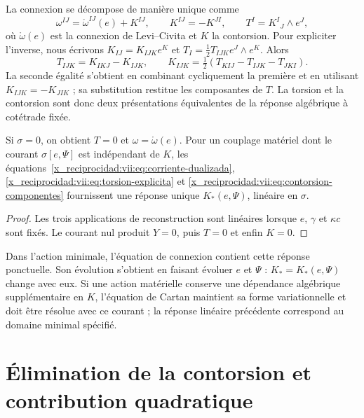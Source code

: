\begin{HMTCompactSection}
La connexion se décompose de manière unique comme
\begin{equation}
 \omega^{IJ}=\mathring\omega^{IJ}(e)+K^{IJ},\qquad
 K^{IJ}=-K^{JI},\qquad T^I=K^I{}_{J}\wedge e^J,
 \label{x_reciprocidad:vii:eq:contorsion}
\end{equation}
où \(\mathring\omega(e)\) est la connexion de Levi--Civita et \(K\) la contorsion. Pour expliciter l'inverse, nous écrivons \(K_{IJ}=K_{IJK}e^K\) et \(T_I=\tfrac12T_{IJK}e^J\wedge e^K\). Alors
\begin{equation}
 T_{IJK}=K_{IKJ}-K_{IJK},\qquad
 K_{IJK}=\tfrac12(T_{KIJ}-T_{IJK}-T_{JKI}).
 \label{x_reciprocidad:vii:eq:contorsion-componentes}
\end{equation}
La seconde égalité s'obtient en combinant cycliquement la première et
en utilisant \(K_{IJK}=-K_{JIK}\) ; sa substitution restitue les composantes
de \(T\). La torsion et la contorsion sont donc deux
présentations équivalentes de la réponse algébrique à cotétrade fixée.

\begin{corollary}
\label{x_reciprocidad:vii:cor:desacoplamiento-torsional}
Si \(\sigma=0\), on obtient \(T=0\) et \(\omega=\mathring\omega(e)\). Pour un couplage matériel dont le courant \(\sigma[e,\Psi]\) est indépendant de \(K\), les équations~\eqref{x_reciprocidad:vii:eq:corriente-dualizada}, \eqref{x_reciprocidad:vii:eq:torsion-explicita} et \eqref{x_reciprocidad:vii:eq:contorsion-componentes} fournissent une réponse unique \(K_*(e,\Psi)\), linéaire en \(\sigma\).
\end{corollary}
\begin{proof}
Les trois applications de reconstruction sont linéaires lorsque \(e\),
\(\gamma\) et \(\kappa c\) sont fixés. Le courant nul produit
\(Y=0\), puis \(T=0\) et enfin \(K=0\).
\end{proof}

Dans l'action minimale, l'équation de connexion contient cette réponse
ponctuelle. Son évolution s'obtient en faisant évoluer \(e\) et \(\Psi\) :
\(K_*=K_*(e,\Psi)\) change avec eux. Si une action matérielle conserve
une dépendance algébrique supplémentaire en \(K\), l'équation de Cartan
maintient sa forme variationnelle et doit être résolue avec ce courant ;
la réponse linéaire précédente correspond au domaine minimal spécifié.

\section{Élimination de la contorsion et contribution quadratique}
\label{x_reciprocidad:vii:subsec:respuesta-cuadratica}


\end{HMTCompactSection}
